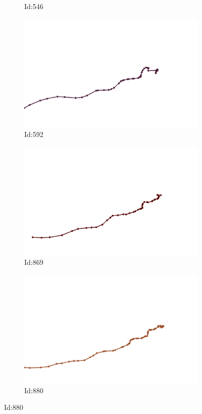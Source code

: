 \documentclass[12pt,twoside]{report}
\begin{document}
\begin{figure}
\begin{subfigure}[b]{0.20\textwidth}
\caption{Id:546}
\end{subfigure}
\begin{subfigure}[b]{0.20\textwidth}
\centering
\includegraphics[width=\textwidth]{../../trajectories/592.png}
\caption{Id:592}
\end{subfigure}
\begin{subfigure}[b]{0.20\textwidth}
\centering
\includegraphics[width=\textwidth]{../../trajectories/869.png}
\caption{Id:869}
\end{subfigure}
\begin{subfigure}[b]{0.20\textwidth}
\centering
\includegraphics[width=\textwidth]{../../trajectories/880.png}
\caption{Id:880}
\end{subfigure}
\end{figure}
\end{document}
